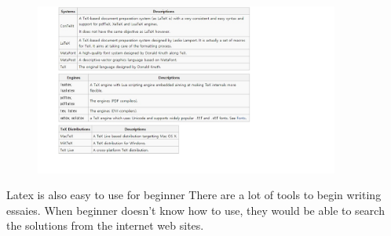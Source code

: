 \begin{figure}
	\includegraphics[width=10cm]{234}
\end{figure}

Latex is also easy to use for beginner There are a lot of tools to begin writing essaies. When beginner doesn't know how to use, they would be able to search the solutions from the internet web sites. 
	
